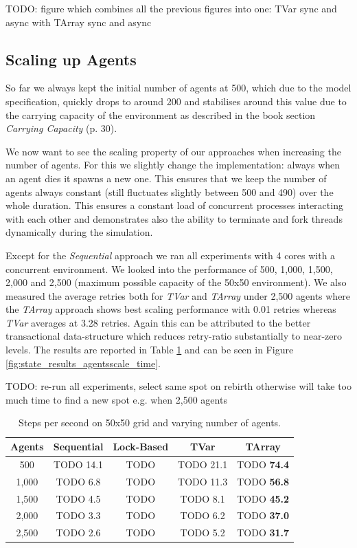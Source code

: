 TODO: figure which combines all the previous figures into one: TVar sync and async with TArray sync and async

\subsection{Scaling up Agents}
So far we always kept the initial number of agents at 500, which due to the model specification, quickly drops to around 200 and stabilises around this value due to the carrying capacity of the environment as described in the book \cite{epstein_growing_1996} section \textit{Carrying Capacity} (p. 30).

We now want to see the scaling property of our approaches when increasing the number of agents. For this we slightly change the implementation: always when an agent dies it spawns a new one. This ensures that we keep the number of agents always constant (still fluctuates slightly between 500 and 490) over the whole duration. This ensures a constant load of concurrent processes interacting with each other and demonstrates also the ability to terminate and fork threads dynamically during the simulation.

Except for the \textit{Sequential} approach we ran all experiments with 4 cores with a concurrent environment. We looked into the performance of 500, 1,000, 1,500, 2,000 and 2,500 (maximum possible capacity of the 50x50 environment). We also measured the average retries both for \textit{TVar} and \textit{TArray} under 2,500 agents where the \textit{TArray} approach shows best scaling performance with 0.01 retries whereas \textit{TVar} averages at 3.28 retries. Again this can be attributed to the better transactional data-structure which reduces retry-ratio substantially to near-zero levels. The results are reported in Table \ref{tab:state_results_agentsscale_time} and can be seen in Figure \ref{fig:state_results_agentsscale_time}.

TODO: re-run all experiments, select same spot on rebirth otherwise will take too much time to find a new spot e.g. when 2,500 agents

\begin{table}
	\centering
  	\begin{tabular}{ c || c | c | c | c }
        Agents  & Sequential & Lock-Based & TVar       & TArray        \\ \hline \hline 
    	500     & TODO 14.1       & TODO			  &	TODO 21.1       & TODO \textbf{74.4} \\ \hline
   		1,000   & TODO 6.8        & TODO 			  & TODO 11.3       & TODO \textbf{56.8} \\ \hline
   		1,500   & TODO 4.5        & TODO 			  & TODO 8.1        & TODO \textbf{45.2} \\ \hline
   		2,000   & TODO 3.3        & TODO 			  & TODO 6.2        & TODO \textbf{37.0} \\ \hline 
   		2,500   & TODO 2.6        & TODO 			  & TODO 5.2        & TODO \textbf{31.7}
   	\end{tabular}
  	
  	\caption{Steps per second on 50x50 grid and varying number of agents.}
	\label{tab:state_results_agentsscale_time}
\end{table}

